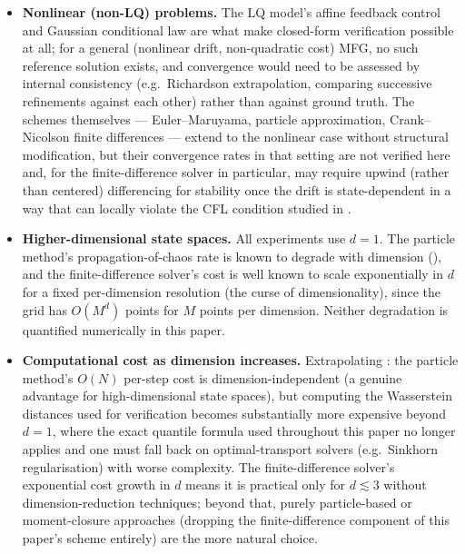 \documentclass[11pt]{article}
\theoremstyle{remark}
\begin{document}
\begin{itemize}
    \item \textbf{Nonlinear (non-LQ) problems.} The LQ model's affine feedback
    control and Gaussian conditional law are what make closed-form verification
    possible at all; for a general (nonlinear drift, non-quadratic cost) MFG,
    no such reference solution exists, and convergence would need to be assessed
    by internal consistency (e.g.\ Richardson extrapolation, comparing successive
    refinements against each other) rather than against ground truth. The
    schemes themselves --- Euler--Maruyama, particle approximation,
    Crank--Nicolson finite differences --- extend to the nonlinear case without
    structural modification, but their convergence rates in that setting are not
    verified here and, for the finite-difference solver in particular, may
    require upwind (rather than centered) differencing for stability once the
    drift is state-dependent in a way that can locally violate the CFL
    condition studied in .

    \item \textbf{Higher-dimensional state spaces.} All experiments use $d=1$.
    The particle method's propagation-of-chaos rate is known to degrade with
    dimension (), and the finite-difference solver's
    cost is well known to scale exponentially in $d$ for a fixed per-dimension
    resolution (the curse of dimensionality), since the grid has $O(M^d)$ points
    for $M$ points per dimension. Neither degradation is quantified numerically
    in this paper.

    \item \textbf{Computational cost as dimension increases.} Extrapolating
    : the particle method's $O(N)$ per-step cost is
    dimension-independent (a genuine advantage for high-dimensional state
    spaces), but computing the Wasserstein distances used for verification
    becomes substantially more expensive beyond $d=1$, where the exact quantile
    formula used throughout this paper no longer applies and one must fall back
    on optimal-transport solvers (e.g.\ Sinkhorn regularisation) with worse
    complexity. The finite-difference solver's exponential cost growth in $d$
    means it is practical only for $d\lesssim3$ without dimension-reduction
    techniques; beyond that, purely particle-based or moment-closure approaches
    (dropping the finite-difference component of this paper's scheme entirely)
    are the more natural choice.


\end{itemize}
\end{document}
